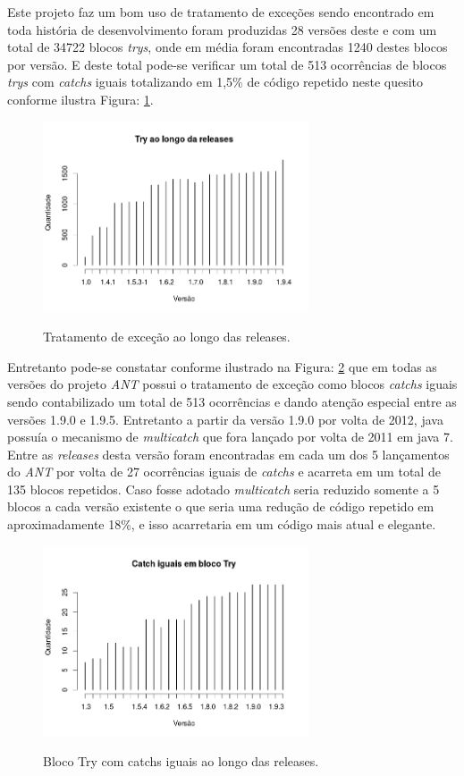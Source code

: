 Este projeto faz um bom uso de tratamento de exceções sendo encontrado em toda história de desenvolvimento foram produzidas 28 versões deste e com um total de 34722 blocos \textit{trys}, onde em média foram encontradas 1240 destes blocos por versão. E deste total pode-se verificar um total de 513 ocorrências de blocos \textit{trys} com \textit{catchs} iguais totalizando em 1,5\% de código repetido neste quesito conforme ilustra Figura: \ref{fig:TrysAnt}.\\

	\begin{figure}[h]
		\center
		\includegraphics[width=0.7\textwidth]{Imagens/trysAnt}
		\label{fig:TrysAnt}
		\caption{Tratamento de exceção ao longo das releases.}
	\end{figure}

Entretanto pode-se constatar conforme ilustrado na Figura: \ref{fig:catchIguais} que em todas as versões do projeto \textit{ANT} possui o tratamento de exceção como blocos \textit{catchs} iguais sendo contabilizado um total de 513 ocorrências e dando atenção especial entre as versões 1.9.0 e 1.9.5. Entretanto a partir da versão 1.9.0 por volta de 2012, java possuía o mecanismo de \textit{multicatch} que fora lançado por volta de 2011 em java 7. Entre as \textit{releases} desta versão foram encontradas em cada um dos 5 lançamentos do \textit{ANT} por volta de 27 ocorrências iguais de \textit{catchs} e acarreta em um total de 135 blocos repetidos. Caso fosse adotado \textit{multicatch} seria reduzido somente a 5 blocos a cada versão existente o que seria uma redução de código repetido em aproximadamente 18\%, e isso acarretaria em um código mais atual e elegante.\\

	\begin{figure}[h]
		\center
		\includegraphics[width=0.7\textwidth]{Imagens/catchsIguais}
		\label{fig:catchIguais}
		\caption{Bloco Try com catchs iguais ao longo das releases.}
	\end{figure}
